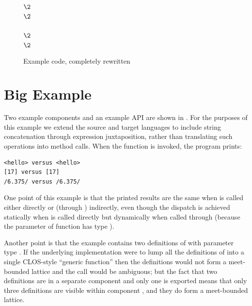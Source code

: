 \begin{figure}[t]
\begin{codeexamplesize}
\begin{tabbing}
 \\
\(\2\) \\
\(\2\)\!\= \\
\>       \\
\(\2\) \\
\(\2\) \\
\end{tabbing}
\end{codeexamplesize}
\vskip-8pt
\caption{Example code, completely rewritten}
\end{figure}



\section{Big Example}

Two example components and an example API are shown
in .  For the purposes of this example
we extend the source and target languages to include
string concatenation through expression juxtaposition,
rather than translating such operations into method calls.
When the  function is invoked, the program prints:
\begin{verbatim}
<hello> versus <hello>
[17] versus [17]
/6.375/ versus /6.375/
\end{verbatim}
One point of this example is that the printed results are the same
when  is called either directly or (through ) indirectly,
even though the dispatch is achieved statically when  is called directly
but dynamically when called through  (because the parameter  of
function  has type ).

Another point is that the example contains
two definitions of  with parameter type .  If the underlying
implementation were to lump all the definitions
of  into a single CLOS-style ``generic function'' then
the definitions would not form a meet-bounded lattice and
the call  would be ambiguous; but the fact that
two definitions are in a separate component  and only
one is exported means that only three definitions are visible
within component , and they do form a meet-bounded lattice.

